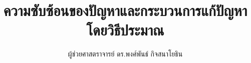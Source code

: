 \documentclass[12pt]{book}
\begin{document}
\title{\textbf{ความซับซ้อนของปัญหาและกระบวนการแก้ปัญหาโดยวิธีประมาณ}}
\author{ผู้ช่วยศาสตราจารย์ ดร.พงศ์พันธ์ กิจสนาโยธิน}


\end{document}
